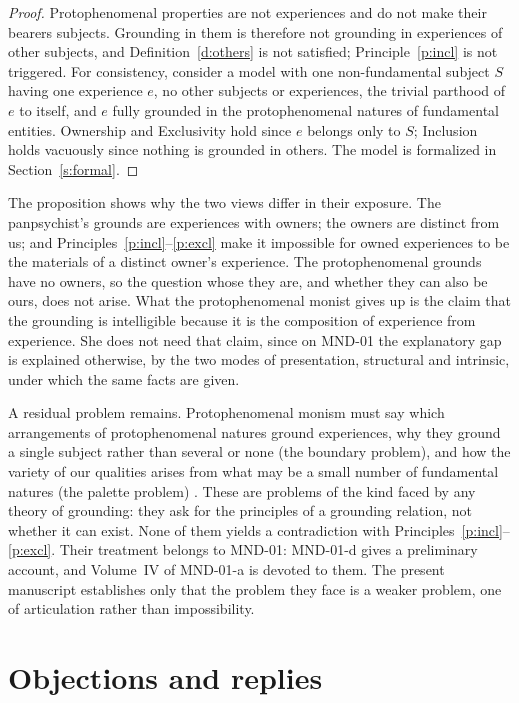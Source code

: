 \documentclass{situationist-preprint}
\begin{document}
\begin{proof}
Protophenomenal properties are not experiences and do not make their bearers subjects. Grounding in them is therefore not grounding in experiences of other subjects, and Definition~\ref{d:others} is not satisfied; Principle~\ref{p:incl} is not triggered. For consistency, consider a model with one non-fundamental subject $S$ having one experience $e$, no other subjects or experiences, the trivial parthood of $e$ to itself, and $e$ fully grounded in the protophenomenal natures of fundamental entities. Ownership and Exclusivity hold since $e$ belongs only to $S$; Inclusion holds vacuously since nothing is grounded in others. The model is formalized in Section~\ref{s:formal}.
\end{proof}

The proposition shows why the two views differ in their exposure. The panpsychist's grounds are experiences with owners; the owners are distinct from us; and Principles~\ref{p:incl}--\ref{p:excl} make it impossible for owned experiences to be the materials of a distinct owner's experience. The protophenomenal grounds have no owners, so the question whose they are, and whether they can also be ours, does not arise. What the protophenomenal monist gives up is the claim that the grounding is intelligible because it is the composition of experience from experience. She does not need that claim, since on MND-01 the explanatory gap is explained otherwise, by the two modes of presentation, structural and intrinsic, under which the same facts are given.

A residual problem remains. Protophenomenal monism must say which arrangements of protophenomenal natures ground experiences, why they ground a single subject rather than several or none (the boundary problem), and how the variety of our qualities arises from what may be a small number of fundamental natures (the palette problem) \citep{Chalmers2017}. These are problems of the kind faced by any theory of grounding: they ask for the principles of a grounding relation, not whether it can exist. None of them yields a contradiction with Principles~\ref{p:incl}--\ref{p:excl}. Their treatment belongs to MND-01: MND-01-d gives a preliminary account, and Volume~IV of MND-01-a is devoted to them. The present manuscript establishes only that the problem they face is a weaker problem, one of articulation rather than impossibility.

\section{Objections and replies}\label{s:obj}
\end{document}
